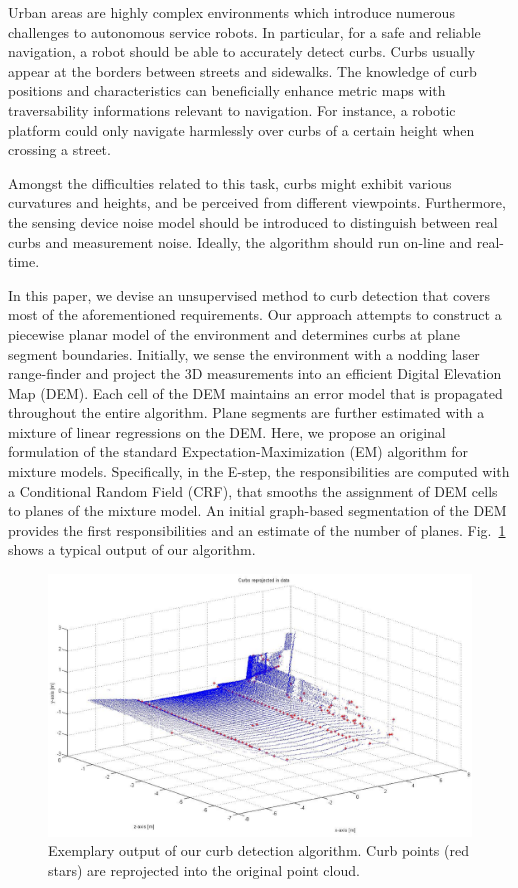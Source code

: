 Urban areas are highly complex environments which introduce numerous challenges
to autonomous service robots. In particular, for a safe and reliable navigation,
a robot should be able to accurately detect curbs. Curbs usually appear at the
borders between streets and sidewalks. The knowledge of curb positions and
characteristics can beneficially enhance metric maps with traversability
informations relevant to navigation. For instance, a robotic platform could only
navigate harmlessly over curbs of a certain height when crossing a street.

Amongst the difficulties related to this task, curbs might exhibit various
curvatures and heights, and be perceived from different viewpoints. Furthermore,
the sensing device noise model should be introduced to distinguish between real
curbs and measurement noise. Ideally, the algorithm should run on-line and
real-time.

In this paper, we devise an unsupervised method to curb detection that covers
most of the aforementioned requirements. Our approach attempts to construct a
piecewise planar model of the environment and determines curbs at plane segment
boundaries. Initially, we sense the environment with a nodding laser
range-finder and project the 3D measurements into an efficient Digital Elevation
Map (DEM). Each cell of the DEM maintains an error model that is propagated
throughout the entire algorithm. Plane segments are further estimated with a
mixture of linear regressions on the DEM. Here, we propose an original
formulation of the standard Expectation-Maximization (EM) algorithm for mixture
models. Specifically, in the E-step, the responsibilities are computed with a
Conditional Random Field (CRF), that smooths the assignment of DEM cells to
planes of the mixture model. An initial graph-based segmentation of the DEM
provides the first responsibilities and an estimate of the number of planes.
Fig.~\ref{fig:intro} shows a typical output of our algorithm.

\begin{figure}[t]
\centering
\includegraphics[width=\columnwidth]{fig/intro.eps}
\caption{Exemplary output of our curb detection algorithm. Curb points
(red stars) are reprojected into the original point cloud.}
\label{fig:intro}
\end{figure}

